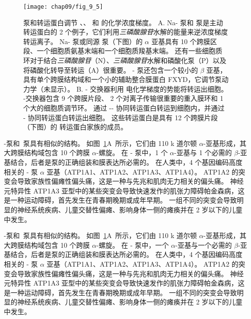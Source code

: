 \begin{figure}[htbp]
	\centering
	\texttt{[image: chap09/fig\_9\_5]}
	\caption{泵和转运蛋白调节 、、 和  的化学浓度梯度。
		A. Na- 泵和  泵是主动转运蛋白的 2 个例子，它们利用\textit{三磷酸腺苷}水解的能量来逆浓度梯度转运离子。
		Na- 泵或同源  泵（下图）的 $\alpha$ 亚基具有 10 个跨膜区段、一个细胞质氨基末端和一个细胞质羧基末端。
		还有一些细胞质环对于结合\textit{三磷酸腺苷}（N）、\textit{三磷酸腺苷}水解和磷酸化泵（P）以及将磷酸化转导至转运（A）很重要。
		- 泵还包含一个较小的 $\beta$ 亚基，具有单个跨膜结构域和一个小的辅助整合膜蛋白 FXYD，它调节泵动力学（未显示）。
		B. - 交换器利用  电化学梯度的势能将转运出细胞。
		-交换器包含 9 个跨膜片段、 2 个对离子传输很重要的重入膜环和 1 个大的细胞质调节环。
		 通过 -- 协同转运蛋白转运到细胞内，并通过 - 协同转运蛋白转运出细胞。
		这些转运蛋白是具有 12 个跨膜片段（下图）的  转运蛋白家族的成员。}
	\label{fig:9_5}
\end{figure}


-泵和~泵具有相似的结构。
如图~\ref{fig:9_5}A~所示，它们由 110 k 道尔顿 $\alpha$-亚基形成，其大跨膜结构域包含 10 个跨膜 $\alpha$-螺旋。
在 - 泵中，1 个 $\alpha$-亚基与 1 个必需的 $\beta$-亚基结合，后者是泵的正确组装和膜表达所必需的。
在人类中，4 个基因编码高度相关的 - 泵 $\alpha$ 亚基（ATP1A1、ATP1A2、ATP1A3、ATP1A4）。
ATP1A2 的突变会导致家族性偏瘫性偏头痛，这是一种与先兆和肌肉无力相关的偏头痛。
神经元特异性 ATP1A3 亚型中的某些突变会导致快速发作的肌张力障碍帕金森病，这是一种运动障碍，首先发生在青春期晚期或成年早期。
一组不同的突变会导致明显的神经系统疾病、儿童交替性偏瘫、影响身体一侧的瘫痪并在 2 岁以下的儿童中发生。


-泵和~泵具有相似的结构。
如图~\ref{fig:9_5}A~所示，它们由 110 k 道尔顿 $\alpha$-亚基形成，其大跨膜结构域包含 10 个跨膜 $\alpha$-螺旋。
在 - 泵中，一个 $\alpha$-亚基与一个必需的 $\beta$-亚基结合，后者是泵的正确组装和膜表达所必需的。
在人类中，4 个基因编码高度相关的 - 泵 $\alpha$ 亚基（ATP1A1、ATP1A2、ATP1A3、ATP1A4）。
ATP1A2 的突变会导致家族性偏瘫性偏头痛，这是一种与先兆和肌肉无力相关的偏头痛。
神经元特异性 ATP1A3 亚型中的某些突变会导致快速发作的肌张力障碍帕金森病，这是一种运动障碍，首先发生在青春期晚期或成年早期。
一组不同的突变会导致明显的神经系统疾病、儿童交替性偏瘫、影响身体一侧的瘫痪并在 2 岁以下的儿童中发生。



